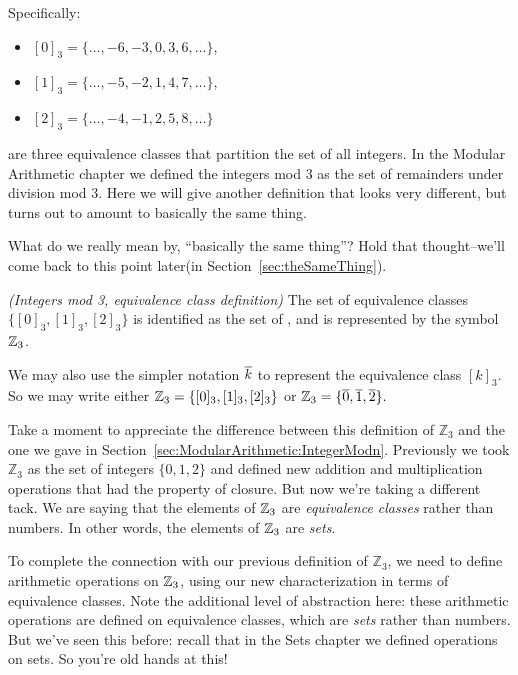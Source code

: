 \noindent
Specifically:
\begin{itemize}
\item[]
$[0]_3 = \{ \ldots, -6, -3, 0, 3, 6, \ldots \}$,
\item[]
$[1]_3 = \{ \ldots, -5, -2, 1, 4, 7, \ldots \}$,
\item[]
$[2]_3 = \{ \ldots, -4, -1, 2, 5, 8, \ldots \}$
\end{itemize}
are three equivalence classes that partition the set of all  integers.
In the Modular Arithmetic chapter we defined the integers mod 3 as the set of remainders under division mod 3. Here we will give another definition that looks very different, but turns out to amount to basically the same thing.

\begin{rem}
What do we really mean by, ``basically the same thing''? Hold that thought--we'll come back to this point later(in Section~\ref{sec:theSameThing}).
 \end{rem}

\begin{defn}\label{mod_eqiv_def_3} \emph{(Integers mod 3, equivalence class definition)}
The set of equivalence classes $\{ [0]_3, [1]_3, [2]_3 \}$ is identified as the set of , and is represented by the symbol~$\mathbb{Z}_3$.

We may also use the simpler notation $\overline{k}$ to represent the equivalence class  $[k]_3$. So we may write either  
$\mathbb{Z}_3 = \{ [0]_3, [1]_3, [2]_3 \}$ or $\mathbb{Z}_3 = \{ \overline{0}, \overline{1}, \overline{2} \} .$
\end{defn}

Take a moment to appreciate the difference between this definition of $\mathbb{Z}_3$  and the one we gave in Section~\ref{sec:ModularArithmetic:IntegerModn}. Previously we took $\mathbb{Z}_3$ as the set of integers $\{0,1,2\}$ and defined new addition and multiplication operations that had the property of closure. But now we're taking a different tack. We are saying that the elements of $\mathbb{Z}_3$ are \emph{equivalence classes} rather than numbers. In other words, the elements of $\mathbb{Z}_3$ are \emph{sets}.

To complete the connection with our previous definition of  $\mathbb{Z}_3$, we need to define arithmetic operations on $\mathbb{Z}_3$, using our new characterization in terms of equivalence classes. Note the additional level of abstraction here: these arithmetic operations are defined on equivalence classes, which are \emph{sets} rather than numbers. But we've seen this before: recall that in the Sets chapter we defined operations on sets. So you're old hands at this!

